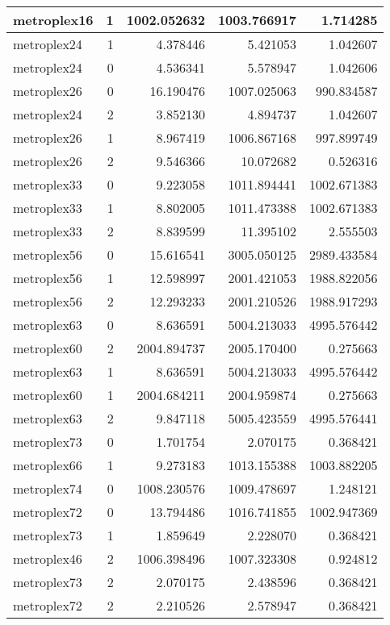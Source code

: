 \begin{longtable}{|l|r|r|r|r|}
metroplex16 & 1 & 1002.052632 & 1003.766917 & 1.714285 \\\hline
metroplex24 & 1 & 4.378446 & 5.421053 & 1.042607 \\\hline
metroplex24 & 0 & 4.536341 & 5.578947 & 1.042606 \\\hline
metroplex26 & 0 & 16.190476 & 1007.025063 & 990.834587 \\\hline
metroplex24 & 2 & 3.852130 & 4.894737 & 1.042607 \\\hline
metroplex26 & 1 & 8.967419 & 1006.867168 & 997.899749 \\\hline
metroplex26 & 2 & 9.546366 & 10.072682 & 0.526316 \\\hline
metroplex33 & 0 & 9.223058 & 1011.894441 & 1002.671383 \\\hline
metroplex33 & 1 & 8.802005 & 1011.473388 & 1002.671383 \\\hline
metroplex33 & 2 & 8.839599 & 11.395102 & 2.555503 \\\hline
metroplex56 & 0 & 15.616541 & 3005.050125 & 2989.433584 \\\hline
metroplex56 & 1 & 12.598997 & 2001.421053 & 1988.822056 \\\hline
metroplex56 & 2 & 12.293233 & 2001.210526 & 1988.917293 \\\hline
metroplex63 & 0 & 8.636591 & 5004.213033 & 4995.576442 \\\hline
metroplex60 & 2 & 2004.894737 & 2005.170400 & 0.275663 \\\hline
metroplex63 & 1 & 8.636591 & 5004.213033 & 4995.576442 \\\hline
metroplex60 & 1 & 2004.684211 & 2004.959874 & 0.275663 \\\hline
metroplex63 & 2 & 9.847118 & 5005.423559 & 4995.576441 \\\hline
metroplex73 & 0 & 1.701754 & 2.070175 & 0.368421 \\\hline
metroplex66 & 1 & 9.273183 & 1013.155388 & 1003.882205 \\\hline
metroplex74 & 0 & 1008.230576 & 1009.478697 & 1.248121 \\\hline
metroplex72 & 0 & 13.794486 & 1016.741855 & 1002.947369 \\\hline
metroplex73 & 1 & 1.859649 & 2.228070 & 0.368421 \\\hline
metroplex46 & 2 & 1006.398496 & 1007.323308 & 0.924812 \\\hline
metroplex73 & 2 & 2.070175 & 2.438596 & 0.368421 \\\hline
metroplex72 & 2 & 2.210526 & 2.578947 & 0.368421 \\\hline

\end{longtable}
